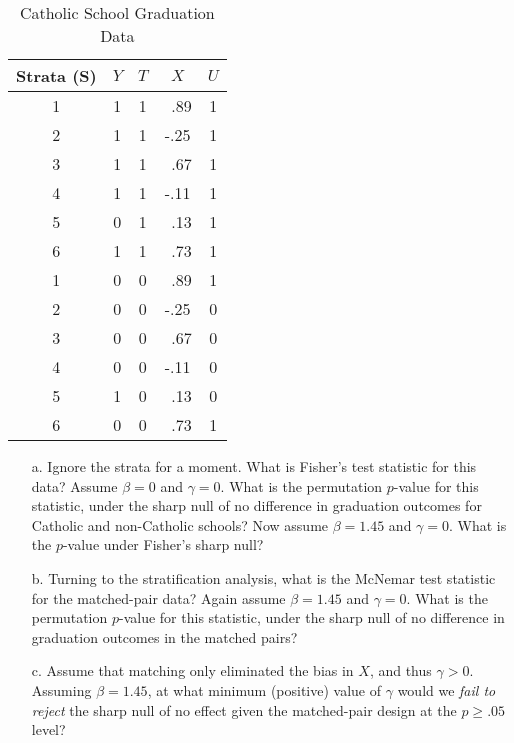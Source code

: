 \documentclass{article}
\begin{document}
\begin{table}[!h]
		\caption{Catholic School Graduation Data}
	\begin{center}
		\begin{tabular}{ccccc}
			Strata (S) & $Y$ & $T$ & $X$ & $U$ \\ \hline  
			1    & 1     & 1   & \ .89   & 1     \\ 
			2    & 1     & 1   & -.25   & 1       \\ 
			3    & 1    & 1    & \ .67   & 1     \\ 
			4    & 1    & 1    & -.11   & 1     \\ 
			5   &  0    &  1    &\ .13   & 1     \\ 
			 6  & 1     & 1     &\ .73   & 1    \\ 
                         1    & 0   & 0    &\ .89   & 1       \\ 
			2    & 0   & 0    & -.25   & 0       \\ 
			3    & 0    & 0    &\ .67   & 0     \\ 
			4    & 0    & 0    & -.11   & 0     \\ 
			5 &  1     &  0    &\ .13   & 0      \\ 
			 6  & 0    &  0   &\ .73    & 1    \\     
		\end{tabular}
		\label{}
	\end{center}
\end{table}

\begin{itemize}
\item[a.] Ignore the strata for a moment.  What is Fisher's test
  statistic for this data?  Assume $\beta=0$ and $\gamma=0$.  What is
  the permutation $p$-value for this statistic, under the sharp null
  of no difference in graduation outcomes for Catholic and
  non-Catholic schools? Now assume $\beta=1.45$ and $\gamma=0$.  What
  is the $p$-value under Fisher's sharp null?
\item[b.] Turning to the stratification analysis, what is the McNemar
  test statistic for the matched-pair data?  Again assume $\beta=1.45$
  and $\gamma=0$. What is the permutation $p$-value for this
  statistic, under the sharp null of no difference in graduation
  outcomes in the matched pairs?
\item[c.] Assume that matching only eliminated the bias in $X$, and
  thus $\gamma>0$. Assuming $\beta=1.45$, at what minimum (positive)
  value of $\gamma$ would we {\em fail to reject} the sharp null of no
  effect given the matched-pair design at the $p\geq.05$ level?

\end{itemize}
\end{document}
